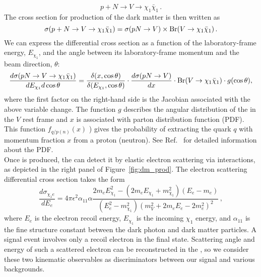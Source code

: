 \begin{equation}
p + N \rightarrow V \rightarrow \chi_1 \bar \chi_1 \,.
\end{equation}
The cross section for production of the dark matter is then written as
\begin{equation}
\sigma(p + N \rightarrow V \rightarrow \chi_1 \bar \chi_1) = \sigma(pN\rightarrow V)\times {\rm Br}(V\rightarrow \chi_1 \bar \chi_1)\,.
\end{equation}
We can express the differential cross section as a function of the  laboratory-frame energy, $E_{\chi_1}$, and the angle
between its laboratory-frame momentum and the beam direction, $\theta$:
\begin{equation}
\frac{d\sigma(pN\rightarrow V\rightarrow \chi_1 \bar \chi_1)}{dE_{\chi_1}d\cos\theta} 
= \frac{\delta(x, \cos\theta)}{\delta(E_{\chi_1}, \cos\theta)}\cdot \frac{d\sigma(pN\rightarrow V)}{dx}\cdot {\rm Br}(V\rightarrow \chi_1 \bar{\chi}_1)\cdot g(\cos\theta),
\end{equation}
where the first factor on the right-hand side is the Jacobian associated with the above variable change. The
function $g$ describes the angular distribution of the  in the $V$ rest frame and $x$ is associated with parton distribution function (PDF).  This function %
$f_{q/p(n)} (x)$ ) gives the probability of extracting the quark $q$ with momentum fraction $x$ from a
proton (neutron). See Ref.~\cite{deNiverville:2012ij} for detailed information about the PDF. \\
Once  is produced, %
the  can detect it by elastic electron scattering via  interactions, as depicted in the right panel of Figure~\ref{fig:dm_prod}.
The electron scattering differential cross section takes the form
\begin{equation}
\frac{d\sigma_{{\chi_1}e}}{dE_{e}} 
= 4\pi \epsilon^{2}\alpha_{11}\alpha \frac{2m_{e}E_{\chi_1}^{2} - (2m_{e}E_{\chi_1} + m_{\chi_1}^{2})(E_e-m_{e})}{(E_e^{2}-m_{\chi_1}^{2})(m_{V}^{2}+2m_{e}E_{e}-2m_{e}^{2})^{2}}\,,
\end{equation}
where $E_{e}$ is the electron recoil  energy, $E_{\chi_1}$ is the incoming  $\chi_1$ energy, and $\alpha_{11}$ is the fine structure constant between the dark photon and dark matter particles. 
A signal event involves only a recoil electron in the final state. Scattering angle and energy of such a scattered electron can be reconstructed in the , so we consider these two kinematic observables as discriminators between our signal and various backgrounds.

